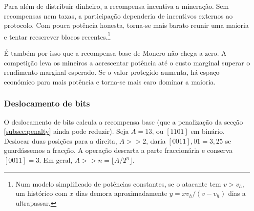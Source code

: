 Para além de distribuir dinheiro, a recompensa incentiva a mineração. Sem
recompensas nem taxas, a participação dependeria de incentivos externos ao
protocolo. Com pouca potência honesta, torna-se mais barato reunir uma maioria
e tentar reescrever blocos recentes.\footnote{Num modelo simplificado de
potências constantes, se o atacante tem $v>v_h$, um histórico com $x$ dias
demora aproximadamente $y=xv_h/(v-v_h)$ dias a ultrapassar.}

É também por isso que a recompensa base de Monero não chega a zero. A
competição leva os mineiros a acrescentar potência até o custo marginal
superar o rendimento marginal esperado. Se o valor protegido aumenta, há
espaço económico para mais potência e torna-se mais caro dominar a maioria.


\subsubsection*{Deslocamento de bits}

O deslocamento de bits calcula a recompensa base (que a penalização da secção
\ref{subsec:penalty} ainda pode reduzir). Seja $A=13$, ou $[1101]$ em binário.
Deslocar duas posições para a direita, $A\mathbin{>>}2$, daria
$[0011]{,}01=3{,}25$ se guardássemos a fracção. A operação descarta a parte
fraccionária e conserva $[0011]=3$. Em geral,
$A\mathbin{>>}n=\lfloor A/2^n\rfloor$.
